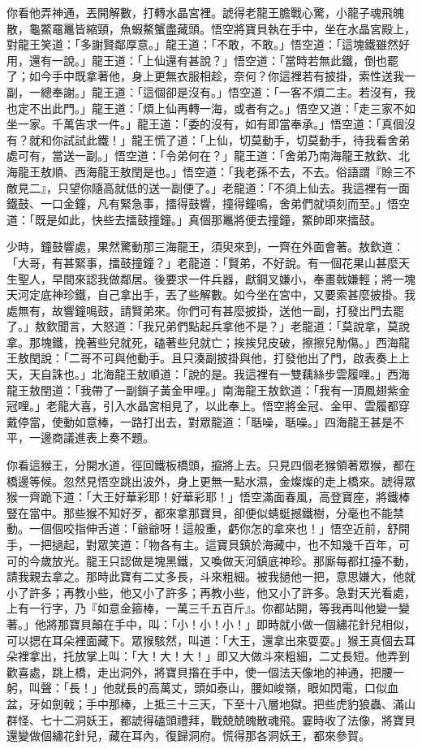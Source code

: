 你看他弄神通，丟開解數，打轉水晶宮裡。諕得老龍王膽戰心驚，小龍子魂飛魄散，龜鱉黿鼉皆縮頸，魚蝦鰲蟹盡藏頭。悟空將寶貝執在手中，坐在水晶宮殿上，對龍王笑道：「多謝賢鄰厚意。」龍王道：「不敢，不敢。」悟空道：「這塊鐵雖然好用，還有一說。」龍王道：「上仙還有甚說？」悟空道：「當時若無此鐵，倒也罷了；如今手中既拿著他，身上更無衣服相趁，奈何？你這裡若有披掛，索性送我一副，一總奉謝。」龍王道：「這個卻是沒有。」悟空道：「一客不煩二主。若沒有，我也定不出此門。」龍王道：「煩上仙再轉一海，或者有之。」悟空又道：「走三家不如坐一家。千萬告求一件。」龍王道：「委的沒有，如有即當奉承。」悟空道：「真個沒有？就和你試試此鐵！」龍王慌了道：「上仙，切莫動手，切莫動手，待我看舍弟處可有，當送一副。」悟空道：「令弟何在？」龍王道：「舍弟乃南海龍王敖欽、北海龍王敖順、西海龍王敖閏是也。」悟空道：「我老孫不去，不去。俗語謂『賒三不敵見二』，只望你隨高就低的送一副便了。」老龍道：「不須上仙去。我這裡有一面鐵鼓、一口金鐘，凡有緊急事，擂得鼓響，撞得鐘鳴，舍弟們就頃刻而至。」悟空道：「既是如此，快些去擂鼓撞鐘。」真個那鼉將便去撞鐘，鱉帥即來擂鼓。

少時，鐘鼓響處，果然驚動那三海龍王，須臾來到，一齊在外面會著。敖欽道：「大哥，有甚緊事，擂鼓撞鐘？」老龍道：「賢弟，不好說。有一個花果山甚麼天生聖人，早間來認我做鄰居。後要求一件兵器，獻鋼叉嫌小，奉畫戟嫌輕；將一塊天河定底神珍鐵，自己拿出手，丟了些解數。如今坐在宮中，又要索甚麼披掛。我處無有，故響鐘鳴鼓，請賢弟來。你們可有甚麼披掛，送他一副，打發出門去罷了。」敖欽聞言，大怒道：「我兄弟們點起兵拿他不是？」老龍道：「莫說拿，莫說拿。那塊鐵，挽著些兒就死，磕著些兒就亡；挨挨兒皮破，擦擦兒觔傷。」西海龍王敖閏說：「二哥不可與他動手。且只湊副披掛與他，打發他出了門，啟表奏上上天，天自誅也。」北海龍王敖順道：「說的是。我這裡有一雙藕絲步雲履哩。」西海龍王敖閏道：「我帶了一副鎖子黃金甲哩。」南海龍王敖欽道：「我有一頂鳳翅紫金冠哩。」老龍大喜，引入水晶宮相見了，以此奉上。悟空將金冠、金甲、雲履都穿戴停當，使動如意棒，一路打出去，對眾龍道：「聒噪，聒噪。」四海龍王甚是不平，一邊商議進表上奏不題。

你看這猴王，分開水道，徑回鐵板橋頭，攛將上去。只見四個老猴領著眾猴，都在橋邊等候。忽然見悟空跳出波外，身上更無一點水濕，金燦燦的走上橋來。諕得眾猴一齊跪下道：「大王好華彩耶！好華彩耶！」悟空滿面春風，高登寶座，將鐵棒豎在當中。那些猴不知好歹，都來拿那寶貝，卻便似蜻蜓撼鐵樹，分毫也不能禁動。一個個咬指伸舌道：「爺爺呀！這般重，虧你怎的拿來也！」悟空近前，舒開手，一把撾起，對眾笑道：「物各有主。這寶貝鎮於海藏中，也不知幾千百年，可可的今歲放光。龍王只認做是塊黑鐵，又喚做天河鎮底神珍。那廝每都扛擡不動，請我親去拿之。那時此寶有二丈多長，斗來粗細。被我撾他一把，意思嫌大，他就小了許多；再教小些，他又小了許多；再教小些，他又小了許多。急對天光看處，上有一行字，乃『如意金箍棒，一萬三千五百斤』。你都站開，等我再叫他變一變著。」他將那寶貝顛在手中，叫：「小！小！小！」即時就小做一個繡花針兒相似，可以揌在耳朵裡面藏下。眾猴駭然，叫道：「大王，還拿出來耍耍。」猴王真個去耳朵裡拿出，托放掌上叫：「大！大！大！」即又大做斗來粗細，二丈長短。他弄到歡喜處，跳上橋，走出洞外，將寶貝揝在手中，使一個法天像地的神通，把腰一躬，叫聲：「長！」他就長的高萬丈，頭如泰山，腰如峻嶺，眼如閃電，口似血盆，牙如劍戟；手中那棒，上抵三十三天，下至十八層地獄。把些虎豹狼蟲、滿山群怪、七十二洞妖王，都諕得磕頭禮拜，戰兢兢魄散魂飛。霎時收了法像，將寶貝還變做個繡花針兒，藏在耳內，復歸洞府。慌得那各洞妖王，都來參賀。

